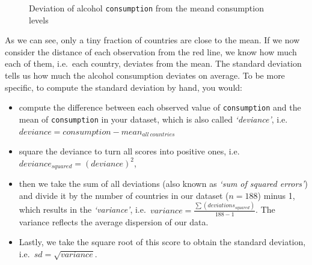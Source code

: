 \documentclass[
  letterpaper,
]{krantz}
\begin{document}
\begin{figure}[H]


\caption{\label{fig-alcohol-consumption-deviation}Deviation of alcohol
\texttt{consumption} from the meand consumption levels}

\end{figure}%

As we can see, only a tiny fraction of countries are close to the mean.
If we now consider the distance of each observation from the red line,
we know how much each of them, i.e.~each country, deviates from the
mean. The standard deviation tells us how much the alcohol consumption
deviates on average. To be more specific, to compute the standard
deviation by hand, you would:

\begin{itemize}
\item
  compute the difference between each observed value of
  \texttt{consumption} and the mean of \texttt{consumption} in your
  dataset, which is also called \emph{`deviance'},
  i.e.~\(deviance = consumption - mean_{all\ countries}\)
\item
  square the deviance to turn all scores into positive ones,
  i.e.~\(deviance_{squared} = (deviance)^2\),
\item
  then we take the sum of all deviations (also known as \emph{`sum of
  squared errors'}) and divide it by the number of countries in our
  dataset (\(n = 188\)) minus 1, which results in the \emph{`variance'},
  i.e.~\(variance = \frac{\sum(deviations_{squared})}{188-1}\). The
  variance reflects the average dispersion of our data.
\item
  Lastly, we take the square root of this score to obtain the standard
  deviation, i.e.~\(sd = \sqrt{variance}\).
\end{itemize}
\end{document}
